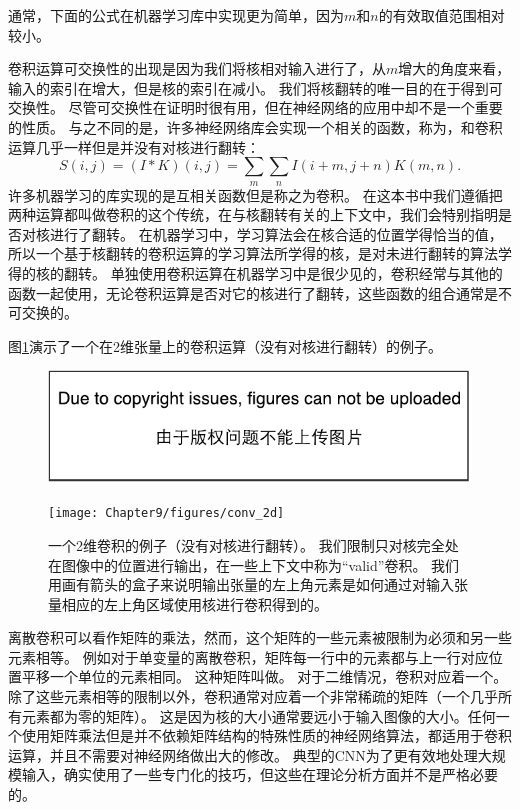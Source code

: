 通常，下面的公式在机器学习库中实现更为简单，因为$m$和$n$的有效取值范围相对较小。

 
卷积运算可交换性的出现是因为我们将核相对输入进行了，从$m$增大的角度来看，输入的索引在增大，但是核的索引在减小。
我们将核翻转的唯一目的在于得到可交换性。
尽管可交换性在证明时很有用，但在神经网络的应用中却不是一个重要的性质。
与之不同的是，许多神经网络库会实现一个相关的函数，称为，和卷积运算几乎一样但是并没有对核进行翻转：
\begin{equation}
S(i, j) = (I*K)(i, j) = \sum_m \sum_n I(i+m, j+n) K(m, n).
\end{equation}
许多机器学习的库实现的是互相关函数但是称之为卷积。
在这本书中我们遵循把两种运算都叫做卷积的这个传统，在与核翻转有关的上下文中，我们会特别指明是否对核进行了翻转。
在机器学习中，学习算法会在核合适的位置学得恰当的值， 所以一个基于核翻转的卷积运算的学习算法所学得的核，是对未进行翻转的算法学得的核的翻转。
单独使用卷积运算在机器学习中是很少见的，卷积经常与其他的函数一起使用，无论卷积运算是否对它的核进行了翻转，这些函数的组合通常是不可交换的。

图\ref{fig:chap9_conv_2d}演示了一个在2维张量上的卷积运算（没有对核进行翻转）的例子。
\begin{figure}[!htb]
\ifOpenSource
\centerline{\includegraphics{figure.pdf}}
\else
\centerline{\texttt{[image: Chapter9/figures/conv\_2d]}}
\fi
\caption{一个2维卷积的例子（没有对核进行翻转）。
我们限制只对核完全处在图像中的位置进行输出，在一些上下文中称为``\gls{valid}''卷积。
我们用画有箭头的盒子来说明输出张量的左上角元素是如何通过对输入张量相应的左上角区域使用核进行卷积得到的。}
\label{fig:chap9_conv_2d}
\end{figure}

离散卷积可以看作矩阵的乘法，然而，这个矩阵的一些元素被限制为必须和另一些元素相等。
例如对于单变量的离散卷积，矩阵每一行中的元素都与上一行对应位置平移一个单位的元素相同。
这种矩阵叫做。
对于二维情况，卷积对应着一个。
除了这些元素相等的限制以外，卷积通常对应着一个非常稀疏的矩阵（一个几乎所有元素都为零的矩阵）。
这是因为核的大小通常要远小于输入图像的大小。任何一个使用矩阵乘法但是并不依赖矩阵结构的特殊性质的神经网络算法，都适用于卷积运算，并且不需要对神经网络做出大的修改。
典型的\gls{CNN}为了更有效地处理大规模输入，确实使用了一些专门化的技巧，但这些在理论分析方面并不是严格必要的。


